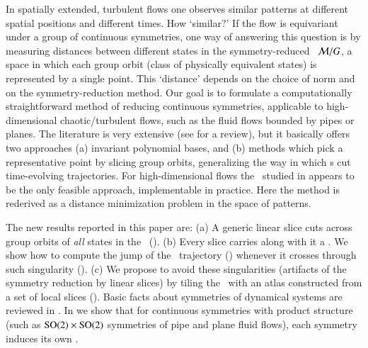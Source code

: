 

In spatially extended, turbulent flows one observes similar patterns at
different spatial positions and different times. How `similar?' If the
flow is equivariant under a group of continuous symmetries, one way of
answering this question is by measuring distances between different
states in the symmetry-reduced \statesp\ ${\cal M}/G$, a space in which
each group orbit (class of physically equivalent states) is represented
by a single point. This `distance' depends on the choice of norm and on
the symmetry-reduction method. Our goal is to formulate a computationally
straightforward method of reducing continuous symmetries, applicable to
high-dimensional chaotic/turbulent flows, such as the fluid flows bounded
by pipes or planes. The literature is very extensive (see
 for a review), but it basically offers two
approaches (a) invariant polynomial bases, and (b) methods which pick a
representative point by slicing group orbits, generalizing the way in
which {\PoincSec}s cut time-evolving trajectories. For high-dimensional
flows the \mslices\ studied in 
appears to be the only feasible approach, implementable in practice. Here
the method is rederived as a distance minimization problem in the space
of patterns.

The new results reported in this paper are:
    (a) A generic linear slice cuts across group orbits of {\em all}
        states in the \statesp\ ().
    (b) Every slice carries along with it a {\sset}. We show how to
        compute the jump of the \reducedsp\ trajectory
         () whenever it crosses
        through such singularity  ().
    (c) We propose to avoid these singularities (artifacts of the symmetry
        reduction by linear slices) by tiling the \statesp\ with an atlas
        constructed from a set of local slices  ().
Basic facts about symmetries of dynamical systems are  reviewed in
. In   we show that for
continuous symmetries with product structure (such as $\textrm{SO}(2) \times
\textrm{SO}(2)$ symmetries of pipe and plane fluid flows), each symmetry induces
its own {\sset}.

